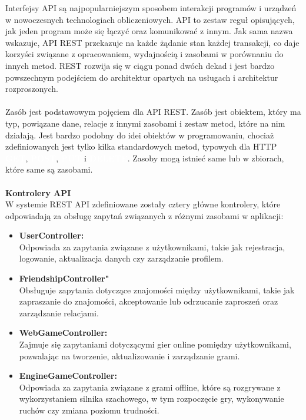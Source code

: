 \documentclass[twoside]{projektInzynierskiMS1}
\begin{document}
\noindent
Interfejsy API są najpopularniejszym sposobem interakcji programów i urządzeń w nowoczesnych technologiach obliczeniowych. API to zestaw reguł opisujących, jak jeden program może się łączyć oraz komunikować z innym. Jak sama nazwa wskazuje, API REST przekazuje na każde żądanie stan każdej transakcji, co daje korzyści związane z opracowaniem, wydajnością i zasobami w porównaniu do innych metod. REST rozwija się w ciągu ponad dwóch dekad i jest bardzo powszechnym podejściem do architektur opartych na usługach i architektur rozproszonych.
\\\\
Zasób jest podstawowym pojęciem dla API REST. Zasób jest obiektem, który ma typ, powiązane dane, relacje z innymi zasobami i zestaw metod, które na nim działają. Jest bardzo podobny do idei obiektów w programowaniu, chociaż zdefiniowanych jest tylko kilka standardowych metod, typowych dla HTTP \textbf{\colorbox{cyan!90}{\textcolor{white}{GET}}}, \textbf{\colorbox{green!90}{\textcolor{white}{POST}}}, \textbf{\colorbox{orange!90}{\textcolor{white}{PUT}}} i \textbf{\colorbox{red!90}{\textcolor{white}{DELETE}}}. Zasoby mogą istnieć same lub w zbiorach, które same są zasobami.
\\\\

\noindent \textbf{Kontrolery API} \\
W systemie REST API zdefiniowane zostały cztery główne kontrolery, które odpowiadają za obsługę zapytań związanych z różnymi zasobami w aplikacji:

\begin{itemize}
    \item \textbf{UserController:}\\
    Odpowiada za zapytania związane z użytkownikami, takie jak rejestracja, logowanie, aktualizacja danych czy zarządzanie profilem.

    \item \textbf{FriendshipController"}\\
    Obsługuje zapytania dotyczące znajomości między użytkownikami, takie jak zapraszanie do znajomości, akceptowanie lub odrzucanie zaproszeń oraz zarządzanie relacjami.

    \item \textbf{WebGameController:}\\
    Zajmuje się zapytaniami dotyczącymi gier online pomiędzy użytkownikami, pozwalając na tworzenie, aktualizowanie i zarządzanie grami.

    \item \textbf{EngineGameController:}\\
    Odpowiada za zapytania związane z grami offline, które są rozgrywane z wykorzystaniem silnika szachowego, w tym rozpoczęcie gry, wykonywanie ruchów czy zmiana poziomu trudności.
\end{itemize}
\end{document}
